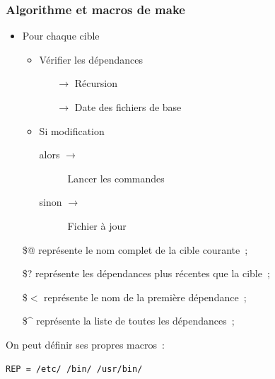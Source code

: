 \begin{frame}[fragile]
  \frametitle{Algorithme et  macros de make}%
\begin{itemize}
      \item Pour chaque cible 
        \begin{itemize}
          \item V\'erifier les d\'ependances
            \begin{itemize}
              \item [$\rightarrow$] R\'ecursion
              \item [$\rightarrow$] Date des fichiers de base
            \end{itemize}
          \item Si modification
            \begin{description}
              \item [\textnormal{alors} $\rightarrow$] Lancer les commandes 
              \item [\textnormal{sinon} $\rightarrow$] Fichier \`a jour
            \end{description}
        \end{itemize}
    \end{itemize}
    \par\bigskip
  \begin{itemize}
  \item[\$@] repr\'esente le nom complet de la cible courante~;
  \item[\$?] repr\'esente les d\'ependances plus r\'ecentes que la cible~;
  \item[\$$<$] repr\'esente le nom de la premi\`ere d\'ependance~;
  \item[\$\^{}] repr\'esente la liste de toutes les d\'ependances~;
  \end{itemize}
  On peut d\'efinir ses propres macros~:
\begin{verbatim}
REP = /etc/ /bin/ /usr/bin/
\end{verbatim}
\end{frame}
